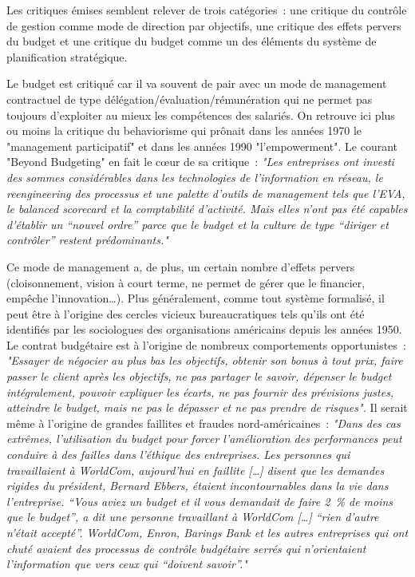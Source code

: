 \documentclass[oneside]{kaobook}
\begin{document}
Les critiques émises semblent relever de trois catégories : une critique du contrôle de gestion comme mode de direction par objectifs, une critique des effets pervers du budget et une critique du budget comme un des éléments du système de planification stratégique.

Le budget est critiqué car il va souvent de pair avec un mode de management contractuel de type délégation/évaluation/rémunération qui ne permet pas toujours d'exploiter au mieux les compétences des salariés. On retrouve ici plus ou moins la critique du behaviorisme qui prônait dans les années 1970 le "management participatif" et dans les années 1990 "l'empowerment". Le courant "Beyond Budgeting" en fait le cœur de sa critique : 
\emph{"Les entreprises ont investi des sommes considérables dans les technologies de l'information en réseau, le reengineering des processus et une palette d'outils de management tels que l'EVA, le balanced scorecard et la comptabilité d'activité. Mais elles n'ont pas été capables d'établir un “nouvel ordre” parce que le budget et la culture de type “diriger et contrôler” restent prédominants."}

Ce mode de management a, de plus, un certain nombre d'effets pervers (cloisonnement, vision à court terme, ne permet de gérer que le financier, empêche l'innovation\ldots{}). Plus généralement, comme tout système formalisé, il peut être à l'origine des cercles vicieux bureaucratiques tels qu'ils ont été identifiés par les sociologues des organisations américains depuis les années 1950. Le contrat budgétaire est à l'origine de nombreux comportements opportunistes : \emph{"Essayer de négocier au plus bas les objectifs, obtenir son bonus à tout prix, faire passer le client après les objectifs, ne pas partager le savoir, dépenser le budget intégralement, pouvoir expliquer les écarts, ne pas fournir des prévisions justes, atteindre le budget, mais ne pas le dépasser et ne pas prendre de risques".} Il serait même à l'origine de grandes faillites et fraudes nord-américaines : \emph{"Dans des cas extrêmes, l'utilisation du budget pour forcer l'amélioration des performances peut conduire à des failles dans l'éthique des entreprises. Les personnes qui travaillaient à WorldCom, aujourd'hui en faillite [\ldots{}] disent que les demandes rigides du président, Bernard Ebbers, étaient incontournables dans la vie dans l'entreprise. “Vous aviez un budget et il vous demandait de faire 2 \% de moins que le budget”, a dit une personne travaillant à WorldCom [\ldots{}] “rien d'autre n'était accepté”. WorldCom, Enron, Barings Bank et les autres entreprises qui ont chuté avaient des processus de contrôle budgétaire serrés qui n'orientaient l'information que vers ceux qui “doivent savoir”."}
\end{document}
